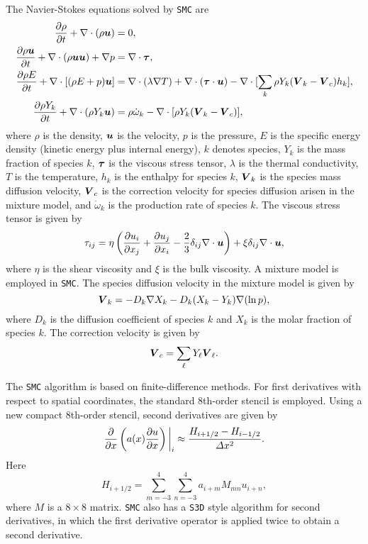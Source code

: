 \documentclass[11pt,letterpaper]{article}
\renewcommand{\vec}[1]{\mbox{\boldmath$#1$}}
\newcommand{\tensor}[1]{\mbox{\boldmath{\ensuremath{#1}}}}
\begin{document}
The Navier-Stokes equations solved by {\tt SMC} are
\begin{align}
\frac{\partial \rho}{\partial t} + \nabla \cdot (\rho
    \vec{u})= { } & 0, \\
\frac{\partial \rho \vec{u}}{\partial t} + \nabla \cdot (\rho
    \vec{u}\vec{u}) + \nabla p= { } & \nabla \cdot
  \tensor{\tau}, \\
\frac{\partial \rho E}{\partial t} + \nabla \cdot [(\rho E + p)
  \vec{u}] = { } & \nabla \cdot (\lambda \nabla T) + \nabla \cdot
  (\tensor{\tau} \cdot \vec{u}) - \nabla \cdot [\sum_k\rho Y_k
  (\vec{V}_k -\vec{V}_c) h_k ], \\
\frac{\partial \rho Y_k}{\partial t} + \nabla \cdot (\rho Y_k \vec{u})
= { } & \rho \dot{\omega}_k  - \nabla \cdot [\rho Y_k
  (\vec{V}_k -\vec{V}_c) ], 
\end{align} 
where $\rho$ is the density, $\vec{u}$ is the velocity, $p$ is the
pressure, $E$ is the specific energy density (kinetic energy plus
internal energy), $k$ denotes species, $Y_k$ is the mass fraction of
species $k$, $\tensor{\tau}$ is the viscous stress tensor, $\lambda$
is the thermal conductivity, $T$ is the temperature, $h_k$ is
the enthalpy for species $k$, $\vec{V}_k$ is the species mass
diffusion velocity, $\vec{V}_c$ is the correction velocity for species
diffusion arisen in the mixture model, and $\dot{\omega}_k$ is the
production rate of species $k$.  The viscous stress tensor is given by
\begin{equation}
  \tau_{ij} = \eta \left(\frac{\partial u_i}{\partial x_j} +
    \frac{\partial u_j}{\partial x_i} - \frac{2}{3}
    \delta_{ij} \nabla \cdot \vec{u} \right) +
  \xi \delta_{ij} \nabla \cdot \vec{u},
\end{equation}
where $\eta$ is the shear viscosity and $\xi$ is the bulk viscosity.
A mixture model is employed in {\tt SMC}.  The species diffusion
velocity in the mixture model is given by
\begin{equation}
  \vec{V}_k = -D_{k} \nabla X_k - D_{k} (X_k-Y_k)
  \nabla (\ln{p}),
\end{equation}
where $D_k$ is the diffusion coefficient of species $k$ and $X_k$ is
the molar fraction of species $k$.  The correction velocity is given by
\begin{equation}
  \vec{V}_c = \sum_\ell Y_\ell \vec{V}_\ell.
\end{equation}

The {\tt SMC} algorithm is based on finite-difference methods.  For
first derivatives with respect to spatial coordinates, the standard
8th-order stencil is employed.  Using a new compact 8th-order stencil,
second derivatives are given by
\begin{equation}
\frac{\partial}{\partial x} \left(a(x) \frac{\partial u}{\partial x}
\right)\bigg{|}_{i} \approx \frac{H_{i+1/2} - H_{i-1/2}}{\Delta x^2}.
\end{equation}
Here
\begin{equation}
  H_{i+1/2} = \sum_{m=-3}^{4} \sum_{n=-3}^{4} a_{i+m} M_{mn} u_{i+n},
\end{equation}
where $M$ is a $8 \times 8$ matrix.  {\tt SMC} also has a {\tt S3D}
style algorithm for second derivatives, in which the first derivative
operator is applied twice to obtain a second derivative.
\end{document}
